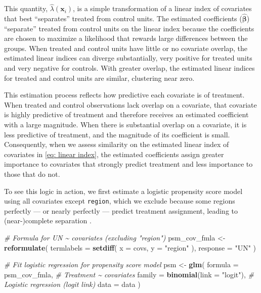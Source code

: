 \documentclass[
  12pt,
  leqno]{article}
\newenvironment{Shaded}{\begin{snugshade}}{\end{snugshade}}
\newcommand{\AttributeTok}[1]{\textcolor[rgb]{0.13,0.29,0.53}{#1}}
\newcommand{\CommentTok}[1]{\textcolor[rgb]{0.56,0.35,0.01}{\textit{#1}}}
\newcommand{\FunctionTok}[1]{\textcolor[rgb]{0.13,0.29,0.53}{\textbf{#1}}}
\newcommand{\NormalTok}[1]{#1}
\newcommand{\OtherTok}[1]{\textcolor[rgb]{0.56,0.35,0.01}{#1}}
\newcommand{\StringTok}[1]{\textcolor[rgb]{0.31,0.60,0.02}{#1}}
\begin{document}
This quantity, \(\hat{\lambda}(\bm{x}_i)\), is a simple transformation
of a linear index of covariates that best ``separates'' treated from
control units. The estimated coefficients (\(\bm{\hat{\beta}}\))
``separate'' treated from control units on the linear index because the
coefficients are chosen to maximize a likelihood that rewards large
differences between the groups. When treated and control units have
little or no covariate overlap, the estimated linear indices can diverge
substantially, very positive for treated units and very negative for
controls. With greater overlap, the estimated linear indices for treated
and control units are similar, clustering near zero.

This estimation process reflects how predictive each covariate is of
treatment. When treated and control observations lack overlap on a
covariate, that covariate is highly predictive of treatment and
therefore receives an estimated coefficient with a large magnitude. When
there is substantial overlap on a covariate, it is less predictive of
treatment, and the magnitude of its coefficient is small. Consequently,
when we assess similarity on the estimated linear index of covariates in
\eqref{eq: linear index}, the estimated coefficients assign greater
importance to covariates that strongly predict treatment and less
importance to those that do not.

To see this logic in action, we first estimate a logistic propensity
score model using all covariates except \texttt{region}, which we
exclude because some regions perfectly --- or nearly perfectly ---
predict treatment assignment, leading to (near-)complete separation
\citep{albertanderson1984}.

\singlespacing

\begin{Shaded}
\begin{Highlighting}[]
\CommentTok{\# Formula for UN \textasciitilde{} covariates (excluding "region")}
\NormalTok{psm\_cov\_fmla }\OtherTok{\textless{}{-}} \FunctionTok{reformulate}\NormalTok{(}
  \AttributeTok{termlabels =} \FunctionTok{setdiff}\NormalTok{(}
    \AttributeTok{x =}\NormalTok{ covs,}
    \AttributeTok{y =} \StringTok{"region"}
\NormalTok{  ),}
  \AttributeTok{response =} \StringTok{"UN"}
\NormalTok{)}

\CommentTok{\# Fit logistic regression for propensity score model}
\NormalTok{psm }\OtherTok{\textless{}{-}} \FunctionTok{glm}\NormalTok{(}
  \AttributeTok{formula =}\NormalTok{ psm\_cov\_fmla,            }\CommentTok{\# Treatment \textasciitilde{} covariates}
  \AttributeTok{family =} \FunctionTok{binomial}\NormalTok{(}\AttributeTok{link =} \StringTok{"logit"}\NormalTok{), }\CommentTok{\# Logistic regression (logit link)}
  \AttributeTok{data =}\NormalTok{ data}
\NormalTok{)}
\end{Highlighting}
\end{Shaded}
\end{document}
